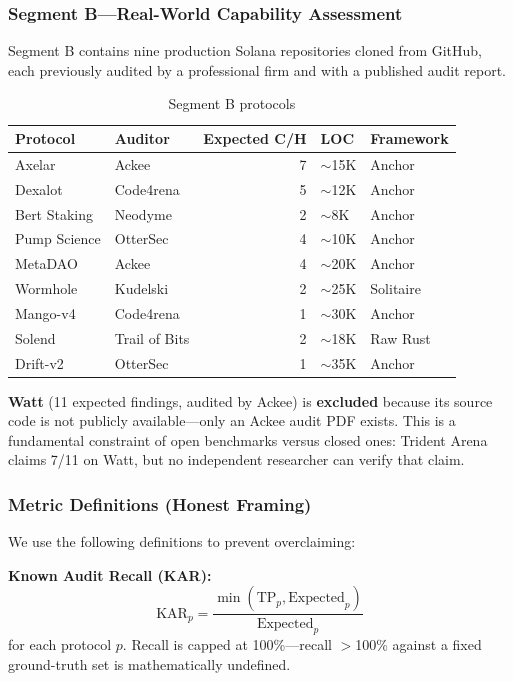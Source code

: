 \documentclass{article}
\begin{document}
\subsubsection{Segment B---Real-World Capability Assessment}

Segment B contains nine production Solana repositories cloned from GitHub, each previously audited by a professional firm and with a published audit report.

\begin{table}[H]
  \caption{Segment B protocols}
  \label{tab:seg_b_protocols}
  \centering
  \begin{tabular}{llrll}
    \toprule
    Protocol & Auditor & Expected C/H & LOC & Framework \\
    \midrule
    Axelar & Ackee & 7 & $\sim$15K & Anchor \\
    Dexalot & Code4rena & 5 & $\sim$12K & Anchor \\
    Bert Staking & Neodyme & 2 & $\sim$8K & Anchor \\
    Pump Science & OtterSec & 4 & $\sim$10K & Anchor \\
    MetaDAO & Ackee & 4 & $\sim$20K & Anchor \\
    Wormhole & Kudelski & 2 & $\sim$25K & Solitaire \\
    Mango-v4 & Code4rena & 1 & $\sim$30K & Anchor \\
    Solend & Trail of Bits & 2 & $\sim$18K & Raw Rust \\
    Drift-v2 & OtterSec & 1 & $\sim$35K & Anchor \\
    \bottomrule
  \end{tabular}
\end{table}

\textbf{Watt} (11 expected findings, audited by Ackee) is \textbf{excluded} because its source code is not publicly available---only an Ackee audit PDF exists. This is a fundamental constraint of open benchmarks versus closed ones: Trident Arena claims 7/11 on Watt, but no independent researcher can verify that claim.

\subsubsection{Metric Definitions (Honest Framing)}

We use the following definitions to prevent overclaiming:

\textbf{Known Audit Recall (KAR):}
\begin{equation}
  \text{KAR}_p = \frac{\min(\text{TP}_p, \text{Expected}_p)}{\text{Expected}_p}
  \label{eq:kar}
\end{equation}
for each protocol $p$. Recall is capped at 100\%---recall $>$100\% against a fixed ground-truth set is mathematically undefined.
\end{document}
